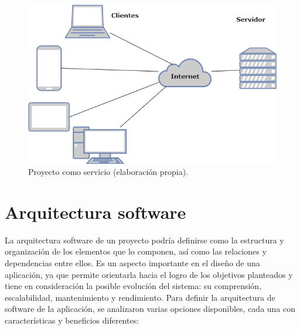 \begin{figure}[ht!]
    \centering
    \includegraphics[width=\linewidth]{imagenes/proyecto_servicio.drawio.png}
    \caption{Proyecto como servicio (elaboración propia).}
    \label{fig:proyecto_como_servicio}
\end{figure}


\section{Arquitectura software}\label{sec:arquitectura_software}
La arquitectura software de un proyecto podría definirse como la estructura y organización de los elementos que lo componen, así como las relaciones y dependencias entre ellos. Es un aspecto importante en el diseño de una aplicación, ya que permite orientarla hacia el logro de los objetivos planteados y tiene en consideración la posible evolución del sistema: su comprensión, escalabilidad, mantenimiento y rendimiento\cite{fernandez2006arquitectura}.
Para definir la arquitectura de software de la aplicación, se analizaron varias opciones disponibles, cada una con características y beneficios diferentes\cite{albin2003art}\cite{garimilla2024art}:

